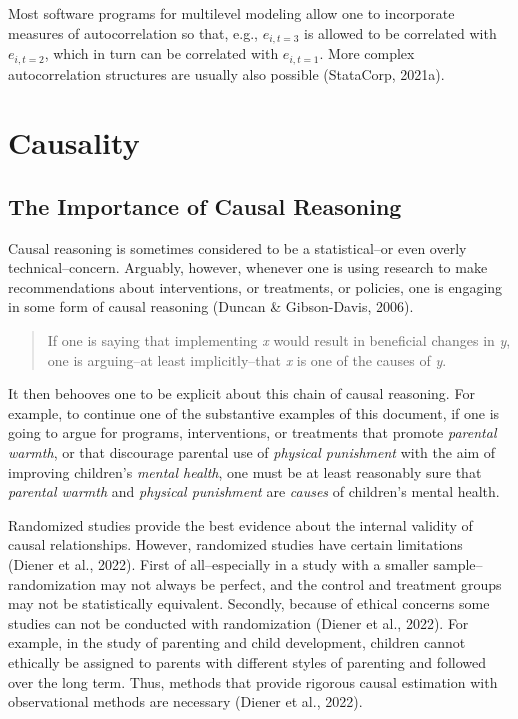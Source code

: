 \documentclass[
  letterpaper,
  DIV=11,
  numbers=noendperiod]{scrreprt}
\begin{document}
Most software programs for multilevel modeling allow one to incorporate
measures of autocorrelation so that, e.g., \(e_{i,t=3}\) is allowed to
be correlated with \(e_{i,t=2}\), which in turn can be correlated with
\(e_{i,t=1}\). More complex autocorrelation structures are usually also
possible (StataCorp, 2021a).

\hypertarget{causality}{%
\section{Causality}\label{causality}}

\hypertarget{the-importance-of-causal-reasoning}{%
\subsection{The Importance of Causal
Reasoning}\label{the-importance-of-causal-reasoning}}

Causal reasoning is sometimes considered to be a statistical--or even
overly technical--concern. Arguably, however, whenever one is using
research to make recommendations about interventions, or treatments, or
policies, one is engaging in some form of causal reasoning (Duncan \&
Gibson-Davis, 2006).

\begin{quote}
If one is saying that implementing \emph{x} would result in beneficial
changes in \emph{y}, one is arguing--at least implicitly--that \emph{x}
is one of the causes of \emph{y}.
\end{quote}

It then behooves one to be explicit about this chain of causal
reasoning. For example, to continue one of the substantive examples of
this document, if one is going to argue for programs, interventions, or
treatments that promote \emph{parental warmth}, or that discourage
parental use of \emph{physical punishment} with the aim of improving
children's \emph{mental health}, one must be at least reasonably sure
that \emph{parental warmth} and \emph{physical punishment} are
\emph{causes} of children's mental health.

Randomized studies provide the best evidence about the internal validity
of causal relationships. However, randomized studies have certain
limitations (Diener et al., 2022). First of all--especially in a study
with a smaller sample--randomization may not always be perfect, and the
control and treatment groups may not be statistically equivalent.
Secondly, because of ethical concerns some studies can not be conducted
with randomization (Diener et al., 2022). For example, in the study of
parenting and child development, children cannot ethically be assigned
to parents with different styles of parenting and followed over the long
term. Thus, methods that provide rigorous causal estimation with
observational methods are necessary (Diener et al., 2022).
\end{document}
